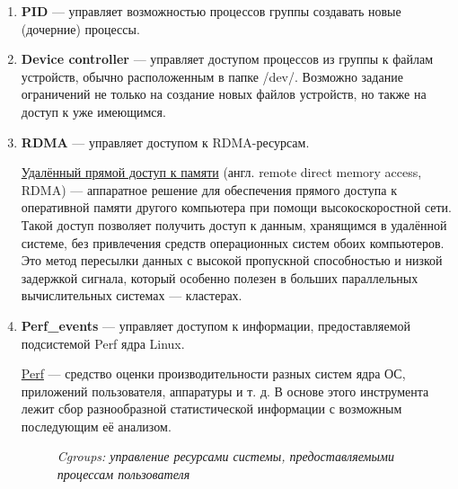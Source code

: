 \documentclass[14pt, a4paper]{article}
\begin{document}
\begin{enumerate}
    \item \textbf{PID} — управляет возможностью процессов группы создавать новые (дочерние) процессы.
    \item \textbf{Device controller} — управляет доступом процессов из группы к файлам устройств, обычно
    расположенным в папке /dev/. Возможно задание ограничений не только на создание новых
    файлов устройств, но также на доступ к уже имеющимся.
    \item \textbf{RDMA} — управляет доступом к RDMA-ресурсам.
    
    \href{https://ru.wikipedia.org/wiki/%D0%A3%D0%B4%D0%B0%D0%BB%D1%91%D0%BD%D0%BD%D1%8B%D0%B9_%D0%BF%D1%80%D1%8F%D0%BC%D0%BE%D0%B9_%D0%B4%D0%BE%D1%81%D1%82%D1%83%D0%BF_%D0%BA_%D0%BF%D0%B0%D0%BC%D1%8F%D1%82%D0%B8}{Удалённый прямой доступ к памяти} (англ. remote direct memory access, RDMA) — аппаратное
решение для обеспечения прямого доступа к оперативной памяти другого компьютера при помощи
высокоскоростной сети. Такой доступ позволяет получить доступ к данным, хранящимся в удалённой
системе, без привлечения средств операционных систем обоих компьютеров. Это метод пересылки
данных с высокой пропускной способностью и низкой задержкой сигнала, который особенно полезен в
больших параллельных вычислительных системах — кластерах.

    \item \textbf{Perf\_events} — управляет доступом к информации, предоставляемой подсистемой Perf ядра Linux.

    \href{https://en.wikipedia.org/wiki/Perf_(Linux)}{Perf} — средство оценки производительности разных систем ядра ОС, приложений пользователя,
аппаратуры и т. д. В основе этого инструмента лежит сбор разнообразной статистической
информации с возможным последующим её анализом.

\begin{figure}[h]%
    \centering
    \caption*{\textit{Cgroups: управление ресурсами системы, предоставляемыми процессам пользователя}\\}
    \label{1.2}
\end{figure}

\end{enumerate}
\end{document}
